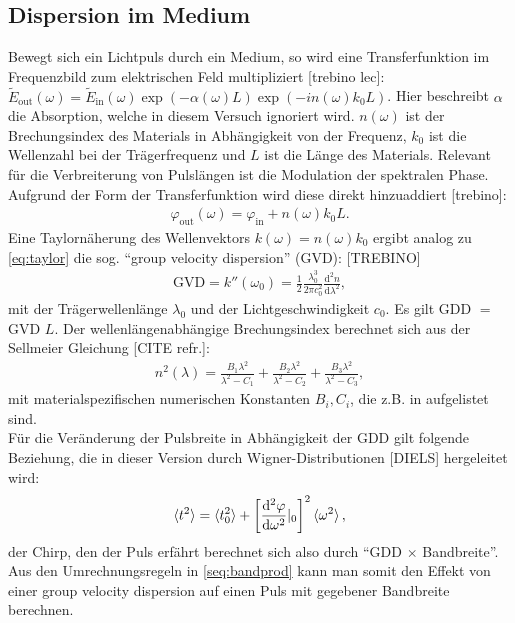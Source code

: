 \documentclass[twoside,        %
               BCOR12mm,       %
               english,ngerman, %
               fleqn,headsepline=false,footsepline=false
              ]{Vorlage/MFPREPORT}
\renewcommand{\d}{\ensuremath{\mathrm{d}}} %
\newcommand{\diff}[3][]{\ensuremath{\frac{\d^{#1}#2}{\d#3^{#1}}}} %
\begin{document}
\subsection{Dispersion im Medium}
Bewegt sich ein Lichtpuls durch ein Medium, so wird eine Transferfunktion im Frequenzbild zum elektrischen Feld multipliziert [trebino lec]: $\tilde E_{\text{out}}(\omega)=\tilde{E}_{\text{in}}(\omega)\exp(-\alpha(\omega)L)\exp(-i n(\omega)k_0L)$. Hier beschreibt $\alpha$ die Absorption, welche in diesem Versuch ignoriert wird. $n(\omega)$ ist der Brechungsindex des Materials in Abhängigkeit von der Frequenz, $k_0$ ist die Wellenzahl bei der Trägerfrequenz und $L$ ist die Länge des Materials. Relevant für die Verbreiterung von Pulslängen ist die Modulation der spektralen Phase. Aufgrund der Form der Transferfunktion wird diese direkt hinzuaddiert [trebino]:
\begin{align}
    \varphi_{\text{out}}(\omega)=\varphi_{\text{in}}+n(\omega)k_0L.
    \label{eq:transferphase}
\end{align}
Eine Taylornäherung des Wellenvektors $k(\omega)=n(\omega)k_0$ ergibt analog zu \cref{eq:taylor} die sog. ``group velocity dispersion'' (GVD): [TREBINO]
\begin{align}
    \text{GVD}=k''(\omega_0)=\frac{1}{2}\frac{\lambda_0^3}{2\pi c_0^2}\diff[2]{n}{\lambda},
    \label{eq:gvd}
\end{align}
mit der Trägerwellenlänge $\lambda_0$ und der Lichtgeschwindigkeit $c_0$.
Es gilt GDD $=$ GVD $ L$.
Der wellenlängenabhängige Brechungsindex berechnet sich aus der Sellmeier Gleichung [CITE refr.]:
\begin{align}
    n^2(\lambda)=\frac{B_1 \lambda^2}{\lambda^2-C_1}+\frac{B_2 \lambda^2}{\lambda^2-C_2}+\frac{B_3 \lambda^2}{\lambda^2-C_3},
    \label{eq:sellmeier}
\end{align}
mit materialspezifischen numerischen Konstanten $B_i, C_i$, die z.B. in
\cite{refr} aufgelistet sind.\\
Für die Veränderung der Pulsbreite in Abhängigkeit der GDD gilt folgende
Beziehung, die in dieser Version durch Wigner-Distributionen [DIELS]
hergeleitet wird:
\begin{align}
    \braket{t^2}=\braket{t_0^2}+\left[ \diff[2]{\varphi}{\omega}|_{0}
    \right]^2\braket{\omega^2},
    \label{eq:pulsverbreiterung}
\end{align}
der Chirp, den der Puls erfährt berechnet sich also durch ``GDD $\times$
Bandbreite''. Aus den Umrechnungsregeln in \cref{seq:bandprod} kann man somit
den Effekt von einer group velocity dispersion auf einen Puls mit gegebener
Bandbreite berechnen.
\end{document}
